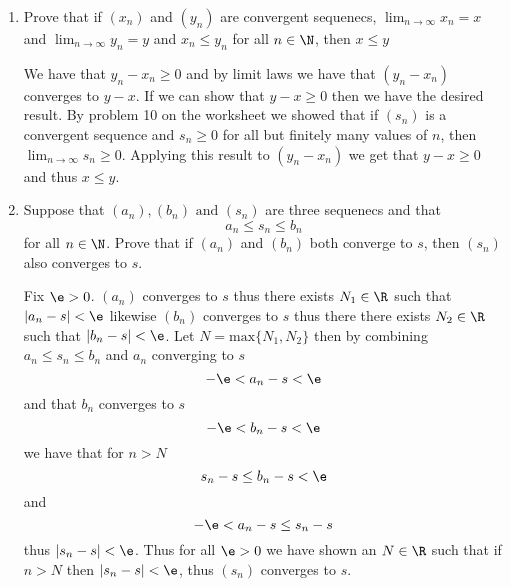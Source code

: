 \documentclass[11pt]{exam}
\begin{document}
\begin{enumerate}
\begin{solution}
            \end{solution}
        \item Prove that if $(x_n)$ and $(y_n)$ are convergent sequenecs, $\lim_{n \to \infty} x_n = x$ and $\lim_{n \to \infty} y_n = y$ and $x_n \leq y_n$ for all $n \in \N$, then $x \leq y$
            \begin{solution}
                We have that $y_n - x_n \geq 0$ and by limit laws we have that $(y_n - x_n)$ converges to $y-x$. If we can show that $y - x \geq 0$ then we have the desired result. By problem 10 on the worksheet we showed that if $(s_n)$ is a convergent sequence and $s_n \geq 0$ for all but finitely many values of $n$, then $\lim_{n \to \infty} s_n \geq 0$. Applying this result to $(y_n - x_n)$ we get that $y - x \geq 0$ and thus $x \leq y$. 
            \end{solution}
        \item Suppose that $(a_n), (b_n)\text { and } (s_n)$ are three sequenecs and that
        $$a_n \leq s_n \leq b_n$$
        for all $n \in \N$. Prove that if $(a_n)$ and $(b_n)$ both converge to $s$, then $(s_n)$ also converges to $s$. 
            \begin{solution}
                Fix $\e > 0$. $(a_n)$ converges to $s$ thus there exists $N_1 \in \R$ such that 
                $|a_n - s| < \e$ likewise $(b_n)$ converges to $s$ thus there there exists $N_2 \in \R$ such that $|b_n - s| < \e$. Let $N = \text{max}\{N_1, N_2\}$ then  by combining $a_n \leq s_n \leq b_n$ and $a_n$ converging to $s$ $$-\e < a_n - s < \e$$ and that $b_n$ converges to $s$ 
                $$-\e < b_n - s < \e$$ we have that for $n > N$
                $$s_n -s \leq b_n -s < \e$$ and 
                $$-\e < a_n -s \leq s_n -s$$ 
                thus $|s_n - s| < \e$. Thus for all $\e > 0$ we have shown an $N \in \R$ such that if $n > N$ then $|s_n - s| < \e$, thus $(s_n)$ converges to $s$.
            \end{solution}
    \end{enumerate}
\end{document}
